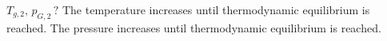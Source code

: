 \( T_{g,2}, \, p_{G,2} \, ? \)  
The temperature increases until thermodynamic equilibrium is reached.  
The pressure increases until thermodynamic equilibrium is reached.